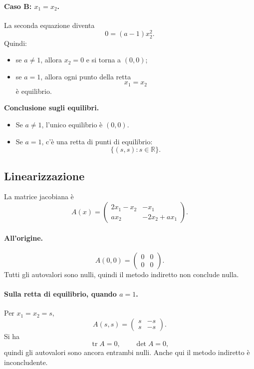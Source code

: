 \paragraph{Caso B: \(x_1=x_2\).}
La seconda equazione diventa
\[
0=(a-1)x_2^2.
\]
Quindi:
\begin{itemize}
    \item se \(a\neq 1\), allora \(x_2=0\) e si torna a \((0,0)\);
    \item se \(a=1\), allora ogni punto della retta
    \[
    x_1=x_2
    \]
    \`e equilibrio.
\end{itemize}

\medskip

\noindent
\textbf{Conclusione sugli equilibri.}
\begin{itemize}
    \item Se \(a\neq 1\), l'unico equilibrio \`e \((0,0)\).
    \item Se \(a=1\), c'\`e una retta di punti di equilibrio:
    \[
    \{(s,s):s\in\mathbb R\}.
    \]
\end{itemize}

\subsection{Linearizzazione}

La matrice jacobiana \`e
\[
A(x)=
\begin{pmatrix}
2x_1-x_2 & -x_1\\
a x_2 & -2x_2 + a x_1
\end{pmatrix}.
\]

\paragraph{All'origine.}
\[
A(0,0)=
\begin{pmatrix}
0 & 0\\
0 & 0
\end{pmatrix}.
\]
Tutti gli autovalori sono nulli, quindi il metodo indiretto non conclude nulla.

\paragraph{Sulla retta di equilibrio, quando \(a=1\).}
Per \(x_1=x_2=s\),
\[
A(s,s)=
\begin{pmatrix}
s & -s\\
s & -s
\end{pmatrix}.
\]
Si ha
\[
\operatorname{tr}A=0,
\qquad
\det A=0,
\]
quindi gli autovalori sono ancora entrambi nulli. Anche qui il metodo indiretto \`e inconcludente.

